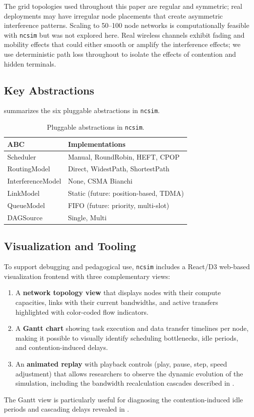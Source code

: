 \documentclass[conference]{IEEEtran}
\newcommand{\ncsim}{\texttt{ncsim}}
\begin{document}
The grid topologies used throughout this paper are regular and symmetric;
real deployments may have irregular node placements that create asymmetric
interference patterns.  Scaling to 50--100 node networks is
computationally feasible with \ncsim{} but was not explored here.  Real
wireless channels exhibit fading and mobility effects that could either
smooth or amplify the interference effects; we use deterministic path loss
throughout to isolate the effects of contention and hidden terminals.

\subsection{Key Abstractions}

 summarizes the six pluggable abstractions in \ncsim{}.

\begin{table}[t]
\centering
\caption{Pluggable abstractions in \ncsim{}.}
\label{tab:abstractions}
\begin{tabular}{@{}lp{4.8cm}@{}}
\toprule
\textbf{ABC} & \textbf{Implementations} \\
\midrule
Scheduler & Manual, RoundRobin, HEFT, CPOP \\
RoutingModel & Direct, WidestPath, ShortestPath \\
InterferenceModel & None, CSMA Bianchi \\
LinkModel & Static (future: position-based, TDMA) \\
QueueModel & FIFO (future: priority, multi-slot) \\
DAGSource & Single, Multi \\
\bottomrule
\end{tabular}
\end{table}

\subsection{Visualization and Tooling}
\label{sec:viz}

To support debugging and pedagogical use, \ncsim{} includes a
React/D3 web-based visualization frontend with three complementary views:
\begin{enumerate}[itemsep=1pt,leftmargin=*]
\item A \textbf{network topology view} that displays nodes with their compute
  capacities, links with their current bandwidths, and active transfers
  highlighted with color-coded flow indicators.
\item A \textbf{Gantt chart} showing task execution and data transfer timelines
  per node, making it possible to visually identify scheduling bottlenecks,
  idle periods, and contention-induced delays.
\item An \textbf{animated replay} with playback controls (play, pause, step,
  speed adjustment) that allows researchers to observe the dynamic evolution
  of the simulation, including the bandwidth recalculation cascades described
  in .
\end{enumerate}
The Gantt view is particularly useful for diagnosing the contention-induced
idle periods and cascading delays revealed in .
\end{document}
